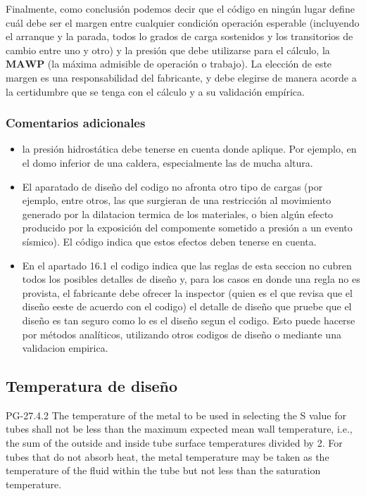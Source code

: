 Finalmente, como conclusión podemos decir que el código en ningún lugar define cuál debe ser el margen entre cualquier condición operación esperable (incluyendo el arranque y la parada, todos lo grados de carga sostenidos y los transitorios de cambio entre uno y otro) y la presión que debe utilizarse para el cálculo, la $\mathbf{MAWP}$ (la máxima admisible de operación o trabajo). La elección de este margen es una responsabilidad del fabricante, y debe elegirse de manera acorde a la certidumbre que se tenga con el cálculo y a su validación empírica.

\subsubsection{Comentarios adicionales}

\begin{itemize}
     \item la presión hidrostática debe tenerse en cuenta donde aplique. Por ejemplo, en el domo inferior de una caldera, especialmente las de mucha altura.
     \item El aparatado de diseño del codigo no afronta otro tipo de cargas (por ejemplo, entre otros, las que surgieran de una restricción al movimiento generado por la dilatacion termica de los materiales, o bien algún efecto producido por la exposición del compomente sometido a presión a un evento sísmico). El código indica que estos efectos deben tenerse en cuenta.
     \item En el apartado 16.1 el codigo indica que las reglas de esta seccion no cubren todos los posibles detalles de diseño y, para los casos en donde una regla no es provista, el fabricante debe ofrecer la inspector (quien es el que revisa que el diseño eeste de acuerdo con el codigo) el detalle de diseño que pruebe que el diseño es tan seguro como lo es el diseño segun el codigo. Esto puede hacerse por métodos analíticos, utilizando otros codigos de diseño o mediante una validacion empirica. 
\end{itemize}


\subsection{Temperatura de diseño}

PG-27.4.2
The temperature of the metal to be used
in selecting the S value for tubes shall not be less than the
maximum expected mean wall temperature, i.e., the sum
of the outside and inside tube surface temperatures
divided by 2. For tubes that do not absorb heat, the
metal temperature may be taken as the temperature of
the fluid within the tube but not less than the saturation
temperature.

